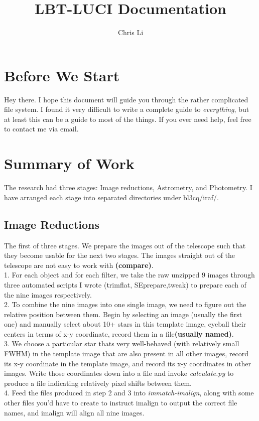 \documentclass{article}
\author{Chris Li}
\title{LBT-LUCI Documentation}
\begin{document}
\section{Before We Start}
Hey there. I hope this document will guide you through the rather complicated file system. I found it very difficult to write a complete guide to \emph{everything}, but at least this can be a guide to most of the things. If you ever need help, feel free to contact me via email.\\
\section{Summary of Work}
The research had three stages: Image reductions, Astrometry, and Photometry. I have arranged each stage into separated directories under bl3cq/iraf/.
\subsection{Image Reductions}
The first of three stages. We prepare the images out of the telescope such that they become usable for the next two stages. The images straight out of the telescope are not easy to work with \textbf{(compare)}. \\

1. For each object and for each filter, we take the raw unzipped 9 images through three automated scripts I wrote (trimflat, SEprepare,tweak) to prepare each of the nine images respectively. \\

2. To combine the nine images into one single image, we need to figure out the relative position between them. Begin by selecting an image (usually the first one) and manually select about 10+ stars in this template image, eyeball their centers in terms of x-y coordinate, record them in a file\textbf{(usually named)}.\\

3. We choose a particular star thats very well-behaved (with relatively small FWHM) in the template image that are also present in all other images, record its x-y coordinate in the template image, and record its x-y coordinates in other images. Write those coordinates down into a file and invoke \emph{calculate.py} to produce a file indicating relatively pixel shifts between them.\\

4. Feed the files produced in step 2 and 3 into \emph{immatch-imalign}, along with some other files you'd have to create to instruct imalign to output the correct file names, and imalign will align all nine images.\\
\end{document}

